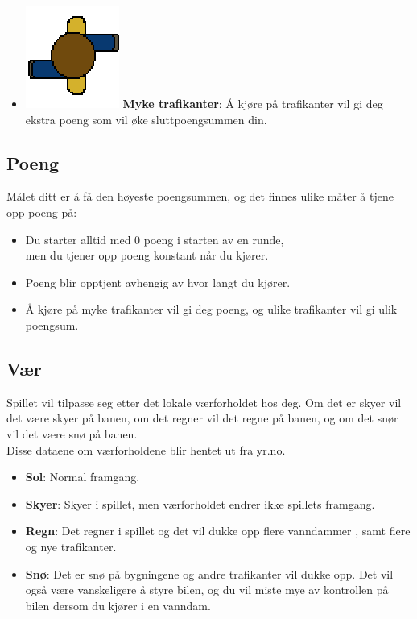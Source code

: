 \documentclass[paper=a4]{article}
\begin{document}
{\begin{itemize}
	\item \includegraphics[scale=0.4]{images/walker.png} \textbf{Myke trafikanter}: Å kjøre på trafikanter vil gi deg ekstra poeng som vil øke sluttpoengsummen din.
\end{itemize}
}

\subsection{Poeng}
Målet ditt er å få den høyeste poengsummen, og det finnes ulike måter å tjene opp poeng på:
\begin{itemize}
	\item Du starter alltid med 0 poeng i starten av en runde, \\men du tjener opp poeng konstant når du kjører.
	\item Poeng blir opptjent avhengig av hvor langt du kjører. 
	\item Å kjøre på myke trafikanter vil gi deg poeng, og ulike trafikanter vil gi ulik poengsum.
\end{itemize}

\subsection{Vær} 
Spillet vil tilpasse seg etter det lokale værforholdet hos deg. Om det er skyer vil det være skyer på banen,
om det regner vil det regne på banen, og om det snør vil det være snø på banen. \\
Disse dataene om værforholdene blir hentet ut fra yr.no. 
\begin{itemize} 
	\item \textbf{Sol}: Normal framgang.
	\item \textbf{Skyer}: Skyer i spillet, men værforholdet endrer ikke spillets framgang.
	\item \textbf{Regn}: Det regner i spillet og det vil dukke opp flere vanndammer	, samt flere og nye trafikanter. 
	\item \textbf{Snø}: Det er snø på bygningene og andre trafikanter vil dukke opp. Det vil også være vanskeligere å styre bilen,
 og du vil miste mye av kontrollen på bilen dersom du kjører i en vanndam.
\end{itemize}
\end{document}
